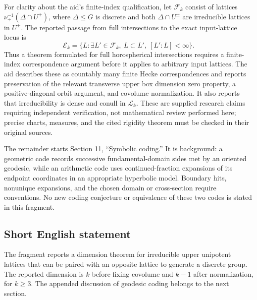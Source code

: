 \documentclass[11pt]{article}
\begin{document}
For clarity about the aid's finite-index qualification, let \(\mathcal F_k\) consist of lattices \(\nu_+^{-1}(\Delta\cap U^+)\), where \(\Delta\leq G\) is discrete and both \(\Delta\cap U^\pm\) are irreducible lattices in \(U^\pm\). The reported passage from full intersections to the exact input-lattice locus is
\[
\mathcal E_k=\{L:\exists L'\in\mathcal F_k,\ L\subset L',\ [L':L]<\infty\}.
\]
Thus a theorem formulated for full horospherical intersections requires a finite-index correspondence argument before it applies to arbitrary input lattices. The aid describes these as countably many finite Hecke correspondences and reports preservation of the relevant transverse upper box dimension zero property, a positive-diagonal orbit argument, and covolume normalization. It also reports that irreducibility is dense and conull in \(\mathcal L_k\). These are supplied research claims requiring independent verification, not mathematical review performed here; precise charts, measures, and the cited rigidity theorem must be checked in their original sources.

The remainder starts Section 11, ``Symbolic coding.'' It is background: a geometric code records successive fundamental-domain sides met by an oriented geodesic, while an arithmetic code uses continued-fraction expansions of its endpoint coordinates in an appropriate hyperbolic model. Boundary hits, nonunique expansions, and the chosen domain or cross-section require conventions. No new coding conjecture or equivalence of these two codes is stated in this fragment.
\subsection{Short English statement}
The fragment reports a dimension theorem for irreducible upper unipotent lattices that can be paired with an opposite lattice to generate a discrete group. The reported dimension is \(k\) before fixing covolume and \(k-1\) after normalization, for \(k\geq3\). The appended discussion of geodesic coding belongs to the next section.
\end{document}
